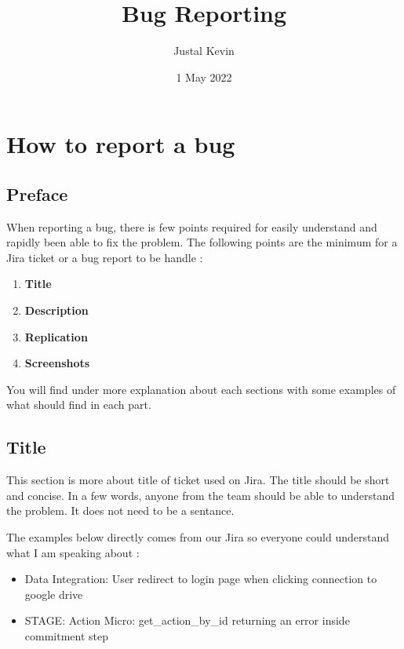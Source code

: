 \documentclass[a4paper,article,oneside]{memoir}
\title{\textbf{Bug Reporting}}
\author{Justal Kevin}
\date{1 May 2022}
\begin{document}
\maketitle
\thispagestyle{empty}
\renewcommand{\contentsname}{Table of contents}
\tableofcontents*
\part{How to report a bug}
	\chapter*{Preface}
		When reporting a bug, there is few points required for easily understand and rapidly been able to fix the problem. The following points are the minimum for a Jira ticket or a bug report to be handle :
	
        \begin{enumerate}
  			\item {\color{BrickRed}\textbf{Title}}
  			\item {\color{BrickRed}\textbf{Description}}
  			\item {\color{BrickRed}\textbf{Replication}}
  			\item {\color{BrickRed}\textbf{Screenshots}}
		\end{enumerate}
		
	You will find under more explanation about each sections with some examples of what should find in each part.
		\chapter{Title}
		This section is more about title of ticket used on Jira. The title should be short and concise. In a few words, anyone from the team should be able to understand the problem. It does not need to be a sentance.
		
		The examples below directly comes from our Jira so everyone could understand what I am speaking about :
		
\noindent{}

\begin{itemize}
  \item Data Integration: User redirect to login page when clicking connection to google drive
  \item STAGE: Action Micro: get\_action\_by\_id returning an error inside commitment step
\end{itemize}
\end{document}
